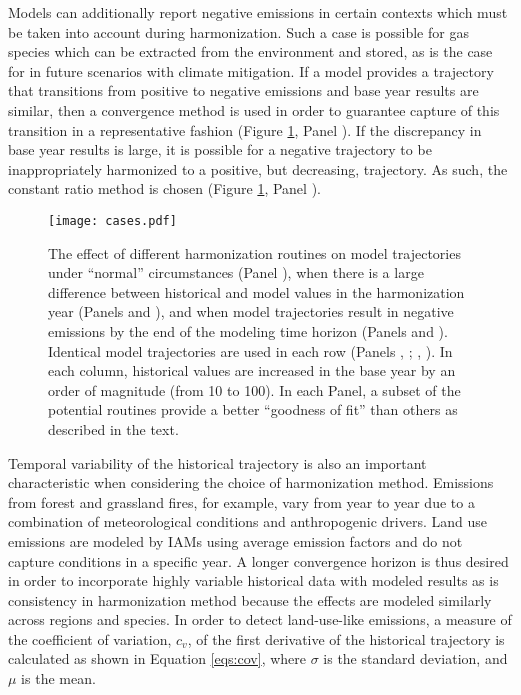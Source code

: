 Models can additionally report negative emissions in certain contexts which must
be taken into account during harmonization. Such a case is possible for gas
species which can be extracted from the environment and stored, as is the case
for \cotwo in future scenarios with climate mitigation. If a model provides a
trajectory that transitions from positive to negative emissions and base year
results are similar, then a convergence method is used in order to guarantee
capture of this transition in a representative fashion (Figure \ref{fig:cases},
Panel ). If the discrepancy in base year results is large, it is
possible for a negative trajectory to be inappropriately harmonized to a
positive, but decreasing, trajectory. As such, the constant ratio method is
chosen (Figure \ref{fig:cases}, Panel ).

\begin{figure}
  \begin{center}
    \texttt{[image: cases.pdf]}
    \caption[]{
      \label{fig:cases}
      The effect of different harmonization routines on model trajectories under
      ``normal'' circumstances (Panel ), when there is a large
      difference between historical and model values in the harmonization year
      (Panels  and ), and when model trajectories result in
      negative emissions by the end of the modeling time horizon (Panels
       and ). Identical model trajectories are used in each row
      (Panels , ; , ). In each column,
      historical values are increased in the base year by an order of magnitude
      (from 10 to 100). In each Panel, a subset of the potential routines
      provide a better ``goodness of fit'' than others as described in the text.
    }
  \end{center}
\end{figure}

Temporal variability of the historical trajectory is also an important
characteristic when considering the choice of harmonization method.  Emissions
from forest and grassland fires, for example, vary from year to year due to a
combination of meteorological conditions and anthropogenic drivers. Land use
emissions are modeled by IAMs using average emission factors and do not capture
conditions in a specific year. A longer convergence horizon is thus desired in
order to incorporate highly variable historical data with modeled results as is
consistency in harmonization method because the effects are modeled similarly
across regions and species. In order to detect land-use-like emissions, a
measure of the coefficient of variation, $c_v$, of the first derivative of the
historical trajectory is calculated as shown in Equation \ref{eqs:cov}, where
$\sigma$ is the standard deviation, and $\mu$ is the mean.

